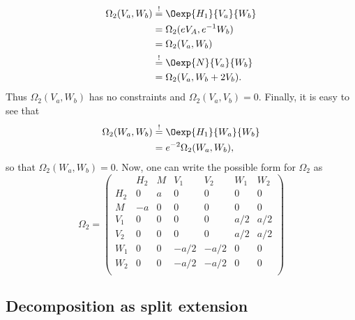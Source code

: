 \begin{equation}
	\begin{split}
		\Omega_2(V_a,W_b)&\stackrel{!}{=}\Oexp{H_1}{V_a}{W_b}\\
		&=\Omega_2(eV_A,e^{-1} W_b)\\
		&=\Omega_2(V_a,W_b)\\
		&\stackrel{!}{=}\Oexp{N}{V_a}{W_b}\\
		&=\Omega_2(V_a,W_b+2V_b).
	\end{split}
\end{equation}
Thus $\Omega_2(V_a,W_b)$ has no constraints and $\Omega_2(V_a,V_b)=0$. Finally, it is easy to see that
\begin{equation}
	\begin{split}
		\Omega_2(W_a,W_b)&\stackrel{!}{=}\Oexp{H_1}{W_a}{W_b}\\
		&=e^{-2}\Omega_2(W_a,W_b),
	\end{split}
\end{equation}
so that $\Omega_2(W_a,W_b)=0$. Now, one can write the possible form for $\Omega_2$ as
\begin{equation}
	\Omega_2=\left(
	\begin{array}{c|c|c|c|c|c|c}
		    & H_2 & M & V_1  & V_2  & W_1 & W_2 \\
		\hline
		H_2 & 0   & a & 0    & 0    & 0   & 0   \\
		\hline
		M   & -a  & 0 & 0    & 0    & 0   & 0   \\
		\hline
		V_1 & 0   & 0 & 0    & 0    & a/2 & a/2 \\
		\hline
		V_2 & 0   & 0 & 0    & 0    & a/2 & a/2 \\
		\hline
		W_1 & 0   & 0 & -a/2 & -a/2 & 0   & 0   \\
		\hline
		W_2 & 0   & 0 & -a/2 & -a/2 & 0   & 0   \\
	\end{array}
	\right)
\end{equation}



\subsection{Decomposition as split extension}

